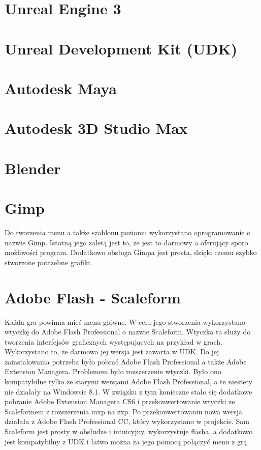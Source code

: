 \section{Unreal Engine 3}

\section{Unreal Development Kit (UDK)}

\section{Autodesk Maya}

\section{Autodesk 3D Studio Max}

\section{Blender}

\section{Gimp}

Do tworzenia menu a także szablonu poziomu wykorzystano oprogramowanie o nazwie Gimp. Istotną jego zaletą jest to, że jest to darmowy a oferujący sporo możliwości program. Dodatkowo obsługa Gimpa jest prosta, dzięki czemu szybko stworzone potrzebne grafiki.

\section{Adobe Flash - Scaleform}

Każda gra powinna mieć menu główne. W celu jego stworzenia wykorzystano wtyczkę do Adobe Flash Professional o nazwie Scaleform. Wtyczka ta służy do tworzenia interfejsów graficznych występujących na przykład w grach. Wykorzystano to, że darmowa jej wersja jest zawarta w UDK. Do jej zainstalowania potrzeba było pobrać Adobe Flash Professional a także Adobe Extension Managera. Problemem było rozszerzenie wtyczki. Było ono kompatybilne tylko ze starymi wersjami Adobe Flash Professional, a te niestety nie działały na Windowsie 8.1. W związku z tym konieczne stało się dodatkowe pobranie 
Adobe Extension Managera CS6 i przekonwertowanie wtyczki ze Scaleformem z rozszerzenia mxp na zxp.
Po przekonwertowaniu nowa wersja działała z Adobe Flash Professional CC, który wykorzystano w projekcie. Sam Scaleform jest prosty w obsłudze i intuicyjny, wykorzystuje flasha, a dodatkowo jest kompatybilny z UDK i łatwo można za jego pomocą połączyć menu z grą.

